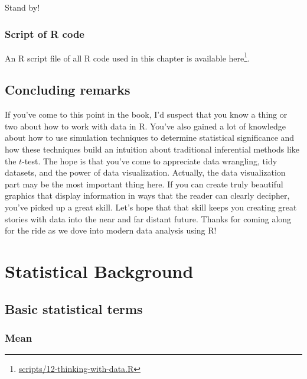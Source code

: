 \documentclass[12pt, krantz2,]{krantz}
\renewcommand{\href}[2]{#2\footnote{\url{#1}}}
\begin{document}
Stand by!

\hypertarget{script-of-r-code-3}{%
\subsection{Script of R code}\label{script-of-r-code-3}}

An R script file of all R code used in this chapter is available \href{scripts/12-thinking-with-data.R}{here}.

\hypertarget{concluding-remarks}{%
\section*{Concluding remarks}\label{concluding-remarks}}


If you've come to this point in the book, I'd suspect that you know a thing or two about how to work with data in R. You've also gained a lot of knowledge about how to use simulation techniques to determine statistical significance and how these techniques build an intuition about traditional inferential methods like the \(t\)-test. The hope is that you've come to appreciate data wrangling, tidy datasets, and the power of data visualization. Actually, the data visualization part may be the most important thing here. If you can create truly beautiful graphics that display information in ways that the reader can clearly decipher, you've picked up a great skill. Let's hope that that skill keeps you creating great stories with data into the near and far distant future. Thanks for coming along for the ride as we dove into modern data analysis using R!

\cleardoublepage

\hypertarget{appendix-appendix}{%
\appendix {}}


\hypertarget{appendixA}{%
\chapter{Statistical Background}\label{appendixA}}

\hypertarget{basic-statistical-terms}{%
\section{Basic statistical terms}\label{basic-statistical-terms}}

\hypertarget{mean}{%
\subsection{Mean}\label{mean}}
\end{document}
